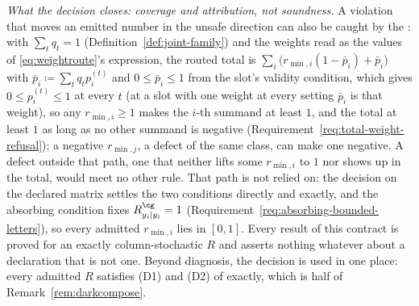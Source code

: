 \begin{remark}
\emph{What the decision closes: coverage and attribution, not soundness.} A
violation that moves an emitted number in the unsafe direction can also be
caught by the : with $\sum_tq_t=1$ (Definition~\ref{def:joint-family})
and the weights read as the values of \eqref{eq:weightroute}'s expression,
the routed total is $\sum_i\big(r_{\min,i}(1-\bar p_i)+\bar p_i\big)$ with
$\bar p_i\coloneqq\sum_tq_tp^{(t)}_i$ and $0\le\bar p_i\le1$ from the slot's
validity condition, which gives $0\le p^{(t)}_i\le1$ at every $t$ (at a slot
with one weight at every setting $\bar p_i$ is that weight), so any
$r_{\min,i}\ge1$ makes the $i$-th summand at least $1$, and the total at least
$1$ as long as no other summand is negative
(Requirement~\ref{req:total-weight-refusal}); a negative $r_{\min,j}$, a defect
of the same class, can make one negative. A defect outside that path,
one that neither lifts some $r_{\min,i}$ to $1$ nor shows up in the total,
would meet no other rule. That path is not relied on: the decision on the
declared matrix settles the two conditions directly and exactly, and the
absorbing condition fixes $R^{\cg}_{y_i|y_i}=1$
(Requirement~\ref{req:absorbing-bounded-letters}), so every admitted
$r_{\min,i}$ lies in $[0,1]$. Every result of this contract is proved for an
exactly column-stochastic $R$ and asserts nothing whatever about a
declaration that is not one. Beyond diagnosis, the decision is used in one
place: every admitted $R$ satisfies (D1) and (D2) of
 exactly, which is half of
Remark~\ref{rem:darkcompose}.
\end{remark}
